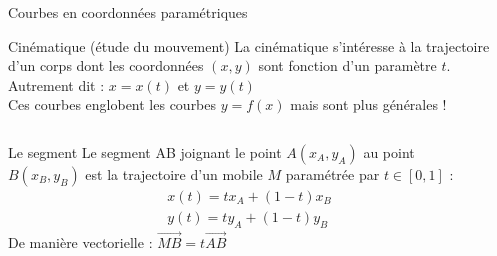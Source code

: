 \documentclass[10pt]{beamer}
\begin{document}
\begin{frame}{Courbes en coordonnées paramétriques}
  \begin{block}{Cinématique (étude du mouvement)}
    La cinématique  s'intéresse à la trajectoire d'un corps dont les coordonnées $(x,y)$ sont fonction d'un paramètre $t$.
Autrement dit : $x = x(t)$ et $y = y(t)$
\\
Ces courbes englobent les courbes $y = f(x)$ mais sont plus générales !
  \end{block}

\begin{columns}[c]
\begin{column}{0.63\textwidth}
\begin{exampleblock}{Le segment}
Le segment AB joignant le point $A(x_A, y_A)$ au point $B(x_B, y_B)$ est la trajectoire d'un mobile $M$ paramétrée par $t \in [0,1]$ :
\begin{align*}
  x(t) = t x_A + (1 - t) x_B \\
  y(t) = t y_A + (1 - t) y_B
\end{align*}
De manière vectorielle : $\overrightarrow{MB} = t \overrightarrow{AB}$
\end{exampleblock}

\end{column}
\begin{column}{0.35\textwidth}
  \end{column}
\end{columns}


\end{frame}
\end{document}

